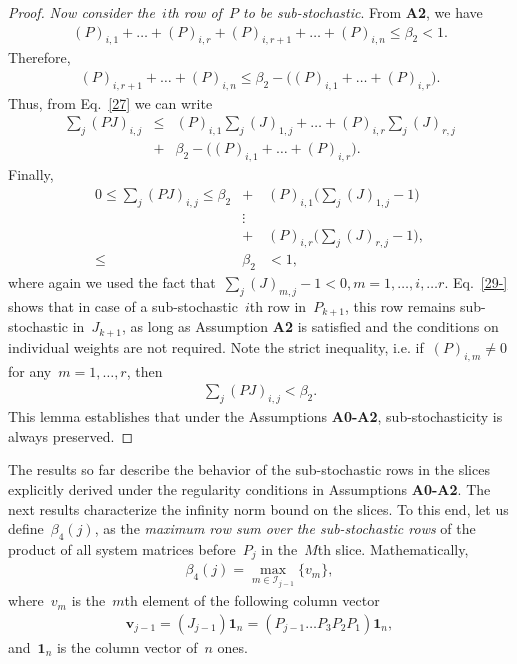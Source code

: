 \documentclass[draftclsnofoot, onecolumn, 12pt]{IEEEtran}
\begin{document}
\begin{proof}
\emph{Now consider the~$i$th row of~$P$ to be sub-stochastic}. From {\bf{A2}}, we have
\begin{eqnarray*}
(P)_{i,1}+\ldots+(P)_{i,r}+(P)_{i,r+1}+\ldots+(P)_{i,n} \leq \beta_2 <1.
\end{eqnarray*}
Therefore,
\begin{eqnarray*}
(P)_{i,r+1}+\ldots+(P)_{i,n} \leq \beta_2 - \Big((P)_{i,1}+\ldots+(P)_{i,r}\Big).
\end{eqnarray*}
Thus, from Eq.~\eqref{27} we can write
\begin{eqnarray}
\sum_{j}(PJ)_{i,j}&\leq&
(P)_{i,1}\sum_{j}(J)_{1,j}+ \ldots + (P)_{i,r}\sum_{j}(J)_{r,j}\nonumber\\
&+& \beta_2- \Big((P)_{i,1}+\ldots+(P)_{i,r}\Big).
\end{eqnarray}
Finally,
\begin{eqnarray}\label{29-}
0 \leq \sum_{j}(PJ)_{i,j}\leq \beta_2 &+&  (P)_{i,1}\Bigg(\sum_{j}(J)_{1,j} -1\Bigg)\nonumber\\
&\vdots& \nonumber\\
&+& (P)_{i,r}\Bigg(\sum_{j}(J)_{r,j} -1\Bigg),\nonumber\\
\leq &\beta_2 & <1,
\end{eqnarray}
where again we used the fact that~$\sum_j(J)_{m,j}-1<0,m=1,\ldots,i,\ldots r$. Eq.~\eqref{29-} shows that in case of a sub-stochastic~$i$th row in~$P_{k+1}$, this row remains sub-stochastic in~$J_{k+1}$, as long as Assumption {\bf{A2}} is satisfied and the conditions on individual weights are not required. Note the strict inequality, i.e. if~$(P)_{i,m}\neq0$ for any~$m=1,\ldots,r$, then
\begin{eqnarray*}
\sum_{j}(PJ)_{i,j} < \beta_2.
\end{eqnarray*}
This lemma establishes that under the Assumptions {\bf A0-A2}, sub-stochasticity is always preserved.
\end{proof} 

The results so far describe the behavior of the sub-stochastic rows in the slices explicitly derived under the regularity conditions in Assumptions {\bf A0-A2}. The next results characterize the infinity norm bound on the slices. To this end, let us define~${\beta}_4(j)$, as the \emph{maximum row sum over the sub-stochastic rows} of the product of all system matrices before~$P_j$ in the~$M$th slice. Mathematically,
\begin{eqnarray}\label{beta4}
{\beta}_4(j)= \max\limits_{m \in \mathcal{I}_{j-1}} \{{v}_m\},
\end{eqnarray}
where~$v_m$ is the~$m$th element of the following column vector
\begin{eqnarray*}
\mathbf{v}_{j-1}= (J_{j-1}){\textbf{1}_n}=(P_{j-1} \ldots P_{3}P_{2}P_{1}){\textbf{1}_n},
\end{eqnarray*}
and~${\textbf{1}}_n$ is the column vector of~$n$ ones.
\end{document}
